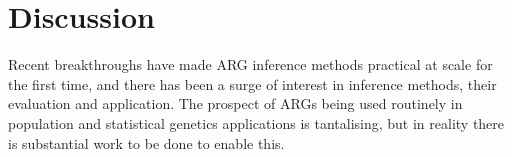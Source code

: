 \documentclass{article}
\begin{document}

\section*{Discussion}
Recent breakthroughs have made ARG inference methods practical
at scale for the first time, and there has been a surge of interest
in inference methods, their evaluation and application.
The prospect of ARGs being used routinely in population
and statistical genetics applications is tantalising,
but in reality there is  substantial work to be done to
enable this.
\end{document}
